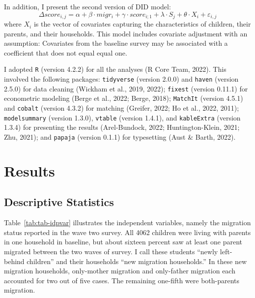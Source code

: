 \documentclass[
  man,floatsintext]{apa7}
\begin{document}
In addition, I present the second version of DID model: \[\Delta score_{i,j} = \alpha + \beta \cdot migr_{i} + \gamma \cdot score_{i;1} + \lambda \cdot S_{j} + \theta \cdot X_{i} + \varepsilon_{i,j}\] where \(X_{i}\) is the vector of covariates capturing the characteristics of children, their parents, and their households. This model includes covariate adjustment with an assumption: Covariates from the baseline survey may be associated with a coefficient that does not equal equal one.

I adopted \texttt{R} (version 4.2.2) for all the analyses (R Core Team, 2022). This involved the following packages: \texttt{tidyverse} (version 2.0.0) and \texttt{haven} (version 2.5.0) for data cleaning (Wickham et al., 2019, 2022); \texttt{fixest} (version 0.11.1) for econometric modeling (Berge et al., 2022; Berge, 2018); \texttt{MatchIt} (version 4.5.1) and \texttt{cobalt} (version 4.3.2) for matching (Greifer, 2022; Ho et al., 2022, 2011); \texttt{modelsummary} (version 1.3.0), \texttt{vtable} (version 1.4.1), and \texttt{kableExtra} (version 1.3.4) for presenting the results (Arel-Bundock, 2022; Huntington-Klein, 2021; Zhu, 2021); and \texttt{papaja} (version 0.1.1) for typesetting (Aust \& Barth, 2022).

\newpage

\hypertarget{results}{%
\section{Results}\label{results}}

\hypertarget{descriptive-statistics}{%
\subsection{Descriptive Statistics}\label{descriptive-statistics}}

Table~\ref{tab:tab-idpvar} illustrates the independent variables, namely the migration status reported in the wave two survey. All 4062 children were living with parents in one household in baseline, but about sixteen percent saw at least one parent migrated between the two waves of survey. I call these students ``newly left-behind children'' and their households ``new migration households.'' In these new migration households, only-mother migration and only-father migration each accounted for two out of five cases. The remaining one-fifth were both-parents migration.

\renewcommand{\arraystretch}{0.72}
\end{document}

